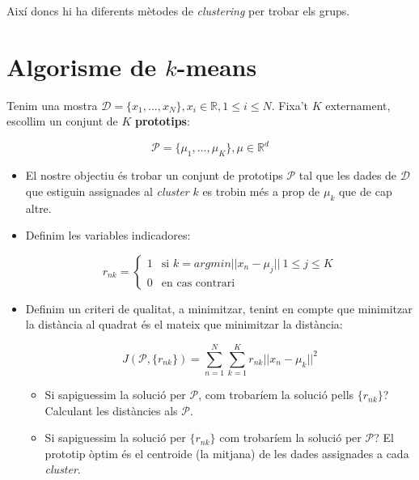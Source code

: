 \documentclass[a4paper]{article}
\begin{document}
Així doncs hi ha diferents mètodes de \emph{clustering} per trobar els grups.

\section{Algorisme de $k$-means}

Tenim una mostra $\mathcal{D} = \{ x_1,..., x_N \} , x_i \in \mathbb{R}, 1 \le i \le N$. Fixa't $K$ externament, escollim un conjunt de $K$ \textbf{prototips}:

$$ \mathcal{P} = \{ \mu_1, ..., \mu_K \}, \mu \in \mathbb{R}^d $$


\begin{itemize}
	\item El nostre objectiu és trobar un conjunt de prototips $\mathcal{P}$ tal que les dades de $\mathcal{D}$ que estiguin assignades al \emph{cluster} $k$ es trobin més a prop de $\mu_k$ que de cap altre.
	\item Definim les variables indicadores:
	
	$$ r_{nk} =
	\begin{cases}
	1 & \text{si } k = argmin ||x_n - \mu_j||\ 1 \le j \le K \\ 0 & \text{en cas contrari}
	\end{cases}$$
	
	\item Definim un criteri de qualitat, a minimitzar, tenint en compte que minimitzar la distància al quadrat és el mateix que minimitzar la distància:
	
	$$ J(\mathcal{P}, \{r_{nk}\}) = \sum_{n=1}^N \sum_{k=1}^K r_{nk} ||x_n - \mu_k||^2 $$
	
	\begin{itemize}
		\item Si sapiguessim la solució per $\mathcal{P}$, com trobaríem la solució pells $\{r_{nk}\}$? Calculant les distàncies als $\mathcal{P}$.
		
		\item Si sapiguessim la solució per $\{r_{nk}\}$ com trobaríem la solució per $\mathcal{P}$? El prototip òptim és el centroide (la mitjana) de les dades assignades a cada \emph{cluster}.
	\end{itemize}
\end{itemize}
\end{document}
